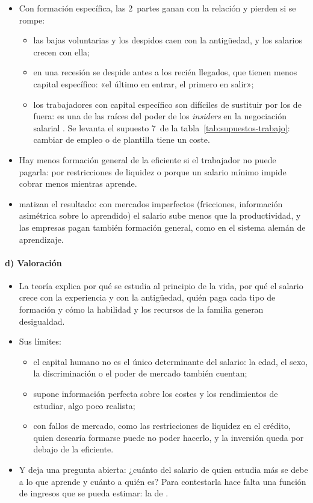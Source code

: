 \documentclass[11pt]{article}
\begin{document}
\begin{itemize}
\item Con formación específica, las 2~partes ganan con la relación y pierden si se rompe:
  \begin{itemize}
  \item las bajas voluntarias y los despidos caen con la antigüedad, y los salarios crecen con ella;
  \item en una recesión se despide antes a los recién llegados, que tienen menos capital específico: «el último en entrar, el primero en salir»;
  \item los trabajadores con capital específico son difíciles de sustituir por los de fuera: es una de las raíces del poder de los \emph{insiders} en la negociación salarial . Se levanta el supuesto 7~de la tabla~\ref{tab:supuestos-trabajo}: cambiar de empleo o de plantilla tiene un coste.
  \end{itemize}
\item Hay menos formación general de la eficiente si el trabajador no puede pagarla: por restricciones de liquidez o porque un salario mínimo impide cobrar menos mientras aprende.
\item \textcite{AcemogluPischke1998Why,AcemogluPischke1999Beyond} matizan el resultado: con mercados imperfectos (fricciones, información asimétrica sobre lo aprendido) el salario sube menos que la productividad, y las empresas pagan también formación general, como en el sistema alemán de aprendizaje.
\end{itemize}

\paragraph{d) Valoración}

\begin{itemize}
\item La teoría explica por qué se estudia al principio de la vida, por qué el salario crece con la experiencia y con la antigüedad, quién paga cada tipo de formación y cómo la habilidad y los recursos de la familia generan desigualdad.
\item Sus límites:
  \begin{itemize}
  \item el capital humano no es el único determinante del salario: la edad, el sexo, la discriminación o el poder de mercado también cuentan;
  \item supone información perfecta sobre los costes y los rendimientos de estudiar, algo poco realista;
  \item con fallos de mercado, como las restricciones de liquidez en el crédito, quien desearía formarse puede no poder hacerlo, y la inversión queda por debajo de la eficiente.
  \end{itemize}
\item Y deja una pregunta abierta: ¿cuánto del salario de quien estudia más se debe a lo que aprende y cuánto a quién es? Para contestarla hace falta una función de ingresos que se pueda estimar: la de .
\end{itemize}
\end{document}
